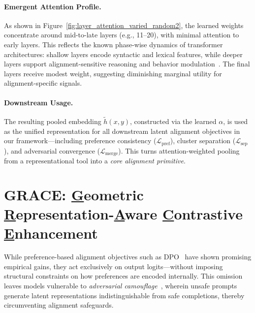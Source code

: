 \vspace{1mm}
\paragraph{Emergent Attention Profile.}
As shown in Figure~\ref{fig:layer_attention_varied_random2}, the learned weights concentrate around mid-to-late layers (e.g., 11–20), with minimal attention to early layers. This reflects the known phase-wise dynamics of transformer architectures: shallow layers encode syntactic and lexical features, while deeper layers support alignment-sensitive reasoning and behavior modulation~\cite{belrose2023language, liu2023lost}. The final layers receive modest weight, suggesting diminishing marginal utility for alignment-specific signals.

\vspace{1mm}
\paragraph{Downstream Usage.}
The resulting pooled embedding \(\tilde{h}(x, y)\), constructed via the learned \(\alpha\), is used as the unified representation for all downstream latent alignment objectives in our framework—including preference consistency (\(\mathcal{L}_{\text{pref}}\)), cluster separation (\(\mathcal{L}_{\mathrm{sep}}\)), and adversarial convergence (\(\mathcal{L}_{\mathrm{merge}}\)). This turns attention-weighted pooling from a representational tool into a \emph{core alignment primitive}.














\section{\textsc{GRACE}: \underline{G}eometric \underline{R}epresentation-\underline{A}ware \underline{C}ontrastive \underline{E}nhancement}

While preference-based alignment objectives such as DPO~\cite{rafailov2023direct} have shown promising empirical gains, they act exclusively on output logits—without imposing structural constraints on how preferences are encoded internally. This omission leaves models vulnerable to \emph{adversarial camouflage}~\cite{turpin2023llms}, wherein unsafe prompts generate latent representations indistinguishable from safe completions, thereby circumventing alignment safeguards.


